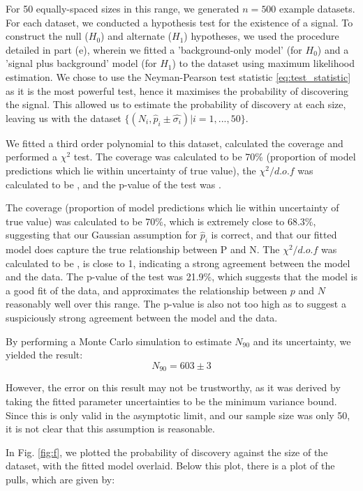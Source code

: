 \documentclass{article}
\begin{document}
For 50 equally-spaced sizes in this range, we generated $n = 500$ example datasets. For each dataset, we conducted a hypothesis test for the existence of a signal. To construct the null ($H_0$) and alternate ($H_1$) hypotheses, we used the procedure detailed in part (e), wherein we fitted a 'background-only model' (for $H_0$) and a 'signal plus background' model (for $H_1$) to the dataset using maximum likelihood estimation. We chose to use the Neyman-Pearson test statistic \ref{eq:test_statistic} as it is the most powerful test, hence it maximises the probability of discovering the signal. This allowed us to estimate the probability of discovery at each size, leaving us with the dataset $\{(N_i, \hat{p}_i \pm \hat{\sigma_i})| i = 1, ..., 50\}$. 

We fitted a third order polynomial to this dataset, calculated the coverage and performed a $\chi^2$ test. The coverage was calculated to be 70\% (proportion of model predictions which lie within uncertainty of true value), the $\chi^2/d.o.f$ was calculated to be , and the p-value of the test was .

The coverage (proportion of model predictions which lie within uncertainty of true value) was calculated to be 70\%, which is extremely close to 68.3\%, suggesting that our Gaussian assumption for $\hat{p}_i$ is correct, and that our fitted model does capture the true relationship between P and N. The $\chi^2/d.o.f$ was calculated to be , is close to 1, indicating a strong agreement between the model and the data. The p-value of the test was 21.9\%, which suggests that the model is a good fit of the data, and approximates the relationship between $p$ and $N$ reasonably well over this range. The p-value is also not too high as to suggest a suspiciously strong agreement between the model and the data. 

By performing a Monte Carlo simulation to estimate $N_{90}$ and its uncertainty, we yielded the result:
$$
N_{90} = 603 \pm 3
$$

However, the error on this result may not be trustworthy, as it was derived by taking the fitted parameter uncertainties to be the minimum variance bound. Since this is only valid in the asymptotic limit, and our sample size was only 50, it is not clear that this assumption is reasonable. 

In Fig. \ref{fig:f}, we plotted the probability of discovery against the size of the dataset, with the fitted model overlaid. Below this plot, there is a plot of the pulls, which are given by:
\end{document}
